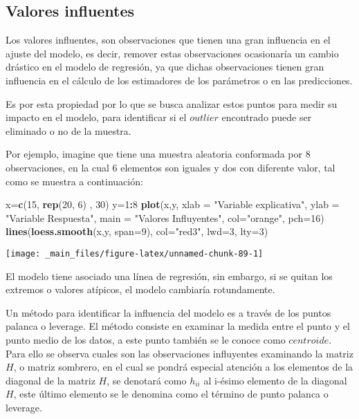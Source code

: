 \documentclass[a4paper,oneside,openany]{book}
\newenvironment{Shaded}{\begin{snugshade}}{\end{snugshade}}
\newcommand{\KeywordTok}[1]{\textcolor[rgb]{0.13,0.29,0.53}{\textbf{#1}}}
\newcommand{\DataTypeTok}[1]{\textcolor[rgb]{0.13,0.29,0.53}{#1}}
\newcommand{\DecValTok}[1]{\textcolor[rgb]{0.00,0.00,0.81}{#1}}
\newcommand{\StringTok}[1]{\textcolor[rgb]{0.31,0.60,0.02}{#1}}
\newcommand{\OperatorTok}[1]{\textcolor[rgb]{0.81,0.36,0.00}{\textbf{#1}}}
\newcommand{\NormalTok}[1]{#1}
\begin{document}
\subsection{Valores influentes}\label{valores-influentes}

Los valores influentes, son observaciones que tienen una gran influencia
en el ajuste del modelo, es decir, remover estas observaciones
ocasionaría un cambio drástico en el modelo de regresión, ya que dichas
observaciones tienen gran influencia en el cálculo de los estimadores de
los parámetros o en las predicciones.

Es por esta propiedad por lo que se busca analizar estos puntos para
medir su impacto en el modelo, para identificar si el \(outlier\)
encontrado puede ser eliminado o no de la muestra.

Por ejemplo, imagine que tiene una muestra aleatoria conformada por 8
observaciones, en la cual 6 elementos son iguales y dos con diferente
valor, tal como se muestra a continuación:

\begin{Shaded}
\begin{Highlighting}[]
\NormalTok{x=}\KeywordTok{c}\NormalTok{(}\DecValTok{15}\NormalTok{, }\KeywordTok{rep}\NormalTok{(}\DecValTok{20}\NormalTok{, }\DecValTok{6}\NormalTok{) , }\DecValTok{30}\NormalTok{) }
\NormalTok{y=}\DecValTok{1}\OperatorTok{:}\DecValTok{8}
\KeywordTok{plot}\NormalTok{(x,y, }\DataTypeTok{xlab =} \StringTok{"Variable explicativa"}\NormalTok{, }
     \DataTypeTok{ylab =} \StringTok{"Variable Respuesta"}\NormalTok{, }
     \DataTypeTok{main =} \StringTok{"Valores Influyentes"}\NormalTok{,}
     \DataTypeTok{col=}\StringTok{"orange"}\NormalTok{, }\DataTypeTok{pch=}\DecValTok{16}\NormalTok{) }
\KeywordTok{lines}\NormalTok{(}\KeywordTok{loess.smooth}\NormalTok{(x,y, }\DataTypeTok{span=}\DecValTok{9}\NormalTok{), }\DataTypeTok{col=}\StringTok{"red3"}\NormalTok{, }\DataTypeTok{lwd=}\DecValTok{3}\NormalTok{, }\DataTypeTok{lty=}\DecValTok{3}\NormalTok{)}
\end{Highlighting}
\end{Shaded}

\begin{center}\texttt{[image: \_main\_files/figure-latex/unnamed-chunk-89-1]} \end{center}

El modelo tiene asociado una línea de regresión, sin embargo, si se
quitan los extremos o valores atípicos, el modelo cambiaría
rotundamente.

Un método para identificar la influencia del modelo es a través de los
puntos palanca o leverage. El método consiste en examinar la medida
entre el punto y el punto medio de los datos, a este punto también se le
conoce como \(centroide\). Para ello se observa cuales son las
observaciones influyentes examinando la matriz \(H\), o matriz sombrero,
en el cual se pondrá especial atención a los elementos de la diagonal de
la matriz \(H\), se denotará como \(h_{ii}\) al i-ésimo elemento de la
diagonal \(H\), este último elemento se le denomina como el término de
punto palanca o leverage.
\end{document}
